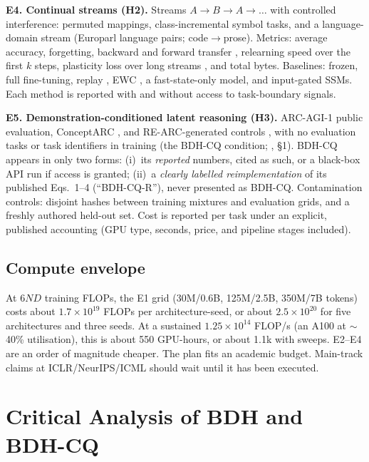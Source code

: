 \documentclass[11pt]{article}
\theoremstyle{remark}
\begin{document}
\textbf{E4. Continual streams (H2).} Streams $A\!\to\!B\!\to\!A\!\to\!\dots$ with controlled interference: permuted
mappings, class-incremental symbol tasks, and a language-domain stream (Europarl language pairs; code$\to$prose).
Metrics: average accuracy, forgetting, backward and forward transfer \citep{lopezpaz2017gem}, relearning speed over
the first $k$ steps, plasticity loss over long streams \citep{dohare2024loss}, and total bytes. Baselines: frozen,
full fine-tuning, replay \citep{rolnick2019replay}, EWC \citep{kirkpatrick2017ewc}, a fast-state-only model, and
input-gated SSMs. Each method is reported with and without access to task-boundary signals.

\textbf{E5. Demonstration-conditioned latent reasoning (H3).} ARC-AGI-1 public evaluation, ConceptARC
\citep{moskvichev2023conceptarc}, and RE-ARC-generated controls \citep{hodel2024rearc}, with no evaluation tasks or
task identifiers in training (the BDH-CQ condition; \citealp{engdahl2026bdhcq}, \S1). BDH-CQ appears in only two
forms: (i)~its \emph{reported} numbers, cited as such, or a black-box API run if access is granted; (ii)~a
\emph{clearly labelled reimplementation} of its published Eqs.~1--4 (``BDH-CQ-R''), never presented as BDH-CQ.
Contamination controls: disjoint hashes between training mixtures and evaluation grids, and a freshly authored
held-out set. Cost is reported per task under an explicit, published accounting (GPU type, seconds, price, and
pipeline stages included).

\subsection{Compute envelope}
At $6ND$ training FLOPs, the E1 grid (30M/0.6B, 125M/2.5B, 350M/7B tokens) costs about $1.7\times10^{19}$ FLOPs per
architecture-seed, or about $2.5\times10^{20}$ for five architectures and three seeds. At a sustained
$1.25\times10^{14}$ FLOP/s (an A100 at $\sim$40\% utilisation), this is about 550 GPU-hours, or about 1.1k with
sweeps. E2--E4 are an order of magnitude cheaper. The plan fits an academic budget. Main-track claims at
ICLR/NeurIPS/ICML should wait until it has been executed.

\section{Critical Analysis of BDH and BDH-CQ}
\label{sec:critique}
\end{document}
